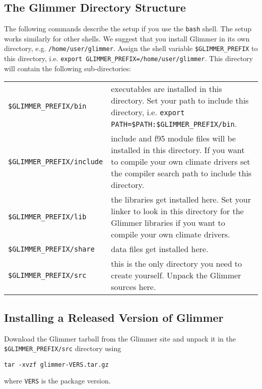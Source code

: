 \subsection{The Glimmer Directory Structure}
The following commands describe the setup if you use the \texttt{bash}
shell. The setup works similarly for other shells. We suggest that you
install Glimmer in its own directory,
e.g. \texttt{/home/user/glimmer}. Assign the shell variable
\texttt{\$GLIMMER\_PREFIX} to this directory, i.e. \texttt{export
  GLIMMER\_PREFIX=/home/user/glimmer}. This directory will contain the
following sub-directories: 
\begin{center}
 \begin{tabular}{lp{9.5cm}}
   \texttt{\$GLIMMER\_PREFIX/bin} & executables are installed in this
   directory. Set your path to include this directory,
   i.e. \texttt{export PATH=\$PATH:\$GLIMMER\_PREFIX/bin}.  \\ 
   \texttt{\$GLIMMER\_PREFIX/include} & include and f95 module files
   will be installed in this directory. If you want to compile your
   own climate drivers set the compiler search path to include this
   directory. \\ 
   \texttt{\$GLIMMER\_PREFIX/lib} & the libraries get installed
   here. Set your linker to look in this directory for the Glimmer
   libraries if you want to compile your own climate drivers. \\ 
   \texttt{\$GLIMMER\_PREFIX/share} & data files get installed here. \\
   \texttt{\$GLIMMER\_PREFIX/src} & this is the only directory you
   need to create yourself. Unpack the Glimmer sources here.
 \end{tabular}
\end{center}
%
\subsection{Installing a Released Version of Glimmer}\label{ug.sec.tarball}
Download the Glimmer tarball from the Glimmer site and unpack it in
the \texttt{\$GLIMMER\_PREFIX/src} directory using 
\begin{verbatim}
tar -xvzf glimmer-VERS.tar.gz
\end{verbatim}
where \texttt{VERS} is the package version.


